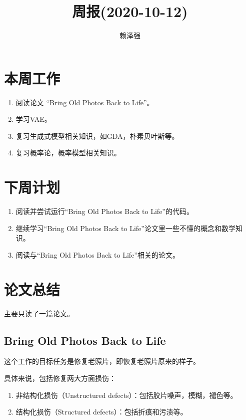 \documentclass[10pt]{article}
\title{周报(2020-10-12)}
\author{赖泽强}
\begin{document}
\maketitle
\tableofcontents


\section{本周工作}

\begin{enumerate}
\item
  阅读论文 ``Bring Old Photos Back to Life''。
\item
  学习VAE。
\item
  复习生成式模型相关知识，如GDA，朴素贝叶斯等。
\item
  复习概率论，概率模型相关知识。
\end{enumerate}

\section{下周计划}

\begin{enumerate}
\item
  阅读并尝试运行``Bring Old Photos Back to Life''的代码。
\item
  继续学习``Bring Old Photos Back to
  Life''论文里一些不懂的概念和数学知识。
\item
  阅读与``Bring Old Photos Back to Life''相关的论文。
\end{enumerate}

\section{论文总结}

主要只读了一篇论文。

\subsection{Bring Old Photos Back to Life}

这个工作\cite{wan2020bringing}\cite{wan2020old}的目标任务是修复老照片，即恢复老照片原来的样子。

具体来说，包括修复两大方面损伤：

\begin{enumerate}
\item
  非结构化损伤（Unstructured defects）：包括胶片噪声，模糊，褪色等。
\item
  结构化损伤（Structured defects）：包括折痕和污渍等。
\end{enumerate}
\end{document}

